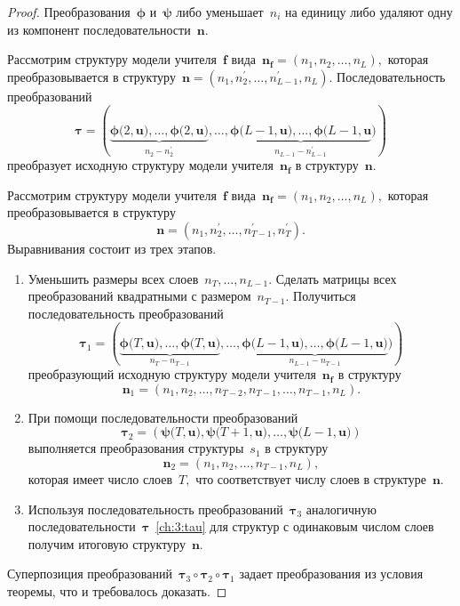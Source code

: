 \begin{proof}
Преобразования~$\bm{\phi}$ и~$\bm{\psi}$ либо уменьшает~$n_i$ на единицу либо удаляют одну из компонент последовательности~$\mathbf{n}$.

Рассмотрим структуру модели учителя~$\mathbf{f}$ вида~$\mathbf{n}_{\mathbf{f}}=\left(n_1, n_2, \ldots, n_L\right),$ которая преобразовывается в структуру~$\mathbf{n}=\left(n_1, n^{'}_2, \ldots, n^{'}_{L-1}, n_L\right).$ Последовательность преобразований
\[
\label{ch:3:tau}
\bm{\tau} = \left(\underbrace{\bm{\phi}\bigr(2, \mathbf{u}\bigr), \ldots, \bm{\phi}\bigr(2, \mathbf{u}\bigr)}_{n_2-n^{'}_2}, \ldots, \underbrace{\bm{\phi}\bigr(L-1, \mathbf{u}\bigr), \ldots, \bm{\phi}\bigr(L-1, \mathbf{u}}_{n_{L-1}-n^{'}_{L-1}}\bigr) \right)
\]
преобразует исходную структуру модели учителя~$\mathbf{n}_{\mathbf{f}}$ в структуру~$\mathbf{n}.$

Рассмотрим структуру модели учителя~$\mathbf{f}$ вида~$\mathbf{n}_{\mathbf{f}}=\left(n_1, n_2, \ldots, n_L\right),$ которая преобразовывается в структуру
\[
    \mathbf{n}=\left(n_1, n^{'}_2, \ldots, n^{'}_{T-1}, n^{'}_T\right).
\]
Выравнивания состоит из трех этапов.
\begin{enumerate}[1.]
    \item Уменьшить размеры всех слоев~$n_{T},\ldots,n_{L-1}.$ Сделать матрицы всех преобразований квадратными с размером~$n_{T-1}.$ Получиться последовательность преобразований
    \[
        \bm{\tau}_1 = \left(\underbrace{\bm{\phi}\bigr(T, \mathbf{u}\bigr), \ldots, \bm{\phi}\bigr(T, \mathbf{u}\bigr)}_{n_{T}-n_{T-1}}, \ldots, \underbrace{\bm{\phi}\bigr(L-1, \mathbf{u}\bigr), \ldots, \bm{\phi}\bigr(L-1, \mathbf{u}\bigr)}_{n_{L-1}-n_{T-1}}\bigr) \right)
    \]
    преобразующий исходную структуру модели учителя~$\mathbf{n}_{\mathbf{f}}$ в структуру
    \[
        \mathbf{n}_\text{1} = \left(n_1, n_2, \ldots, n_{T-2}, n_{T-1}, \ldots, n_{T-1}, n_L\right).
    \]
    \item При помощи последовательности преобразований
    \[
        \bm{\tau}_2 = \left(\bm{\psi}\bigr(T, \mathbf{u}\bigr), \bm{\psi}\bigr(T+1, \mathbf{u}\bigr), \ldots, \bm{\psi}\bigr(L-1, \mathbf{u}\bigr) \right)
    \]
    выполняется преобразования структуры~$s_1$ в структуру
    \[
        \mathbf{n}_\text{2} = \left(n_1, n_2, \ldots, n_{T-1}, n_L\right),
    \]
    которая имеет число слоев~$T,$ что соответствует числу слоев в структуре~$\mathbf{n}$.
    \item Используя последовательность преобразований~$\bm{\tau}_3$ аналогичную последовательности~$\bm{\tau}$~\eqref{ch:3:tau} для структур с одинаковым числом слоев получим итоговую структуру~$\mathbf{n}.$
\end{enumerate}
Суперпозиция преобразований~$\bm{\tau}_3\circ\bm{\tau}_2\circ\bm{\tau}_1$ задает преобразования из условия теоремы, что и требовалось доказать.

\end{proof}

